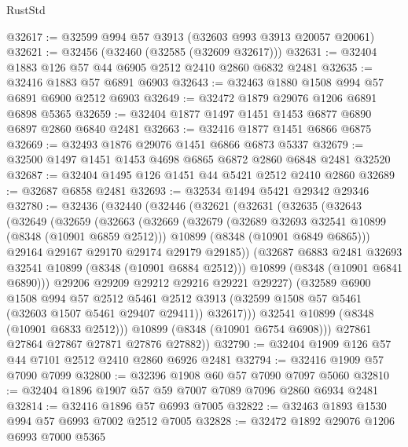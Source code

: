 \begin{lexlean}{RustStd}
\begin{coremodule}
@32617 := @32599 @994 @57 @3913 (@32603 @993 @3913 @20057 @20061)
@32621 := @32456 (@32460 (@32585 (@32609 @32617)))
@32631 := @32404 @1883 @126 @57 @44 @6905 @2512 @2410 @2860 @6832 @2481
@32635 := @32416 @1883 @57 @6891 @6903
@32643 := @32463 @1880 @1508 @994 @57 @6891 @6900 @2512 @6903
@32649 := @32472 @1879 @29076 @1206 @6891 @6898 @5365
@32659 := @32404 @1877 @1497 @1451 @1453 @6877 @6890 @6897 @2860 @6840 @2481
@32663 := @32416 @1877 @1451 @6866 @6875
@32669 := @32493 @1876 @29076 @1451 @6866 @6873 @5337
@32679 := @32500 @1497 @1451 @1453 @4698 @6865 @6872 @2860 @6848 @2481 @32520
@32687 := @32404 @1495 @126 @1451 @44 @5421 @2512 @2410 @2860
@32689 := @32687 @6858 @2481
@32693 := @32534 @1494 @5421 @29342 @29346
@32780 := @32436
    (@32440
      (@32446
        (@32621
          (@32631
            (@32635
              (@32643
                (@32649
                  (@32659
                    (@32663
                      (@32669
                        (@32679
                          (@32689 @32693 @32541 @10899 (@8348 (@10901 @6859 @2512)))
                          @10899
                          (@8348 (@10901 @6849 @6865)))
                        @29164
                        @29167
                        @29170
                        @29174
                        @29179
                        @29185))
                    (@32687 @6883 @2481 @32693 @32541 @10899 (@8348 (@10901 @6884 @2512)))
                    @10899
                    (@8348 (@10901 @6841 @6890)))
                  @29206
                  @29209
                  @29212
                  @29216
                  @29221
                  @29227)
                (@32589
                  @6900
                  @1508
                  @994
                  @57
                  @2512
                  @5461
                  @2512
                  @3913
                  (@32599 @1508 @57 @5461 (@32603 @1507 @5461 @29407 @29411))
                  @32617)))
            @32541
            @10899
            (@8348 (@10901 @6833 @2512)))
          @10899
          (@8348 (@10901 @6754 @6908)))
        @27861
        @27864
        @27867
        @27871
        @27876
        @27882))
@32790 := @32404 @1909 @126 @57 @44 @7101 @2512 @2410 @2860 @6926 @2481
@32794 := @32416 @1909 @57 @7090 @7099
@32800 := @32396 @1908 @60 @57 @7090 @7097 @5060
@32810 := @32404 @1896 @1907 @57 @59 @7007 @7089 @7096 @2860 @6934 @2481
@32814 := @32416 @1896 @57 @6993 @7005
@32822 := @32463 @1893 @1530 @994 @57 @6993 @7002 @2512 @7005
@32828 := @32472 @1892 @29076 @1206 @6993 @7000 @5365

\end{coremodule}
\end{lexlean}
